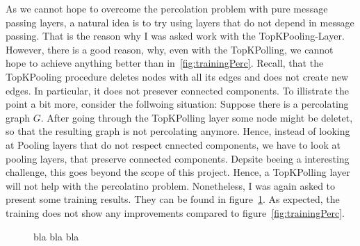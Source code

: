 As we cannot hope to overcome the percolation problem with pure message passing layers, 
a natural idea is to try using layers that do not depend in message passing. 
That is the reason why I was asked work with the TopKPooling-Layer.
However, there is a good reason, why, even with the TopKPolling, we cannot hope to achieve 
anything better than in~\ref{fig:trainingPerc}.
Recall, that the TopKPooling procedure deletes nodes with all its edges and does not create new edges. 
In particular, it does not presever connected components. To illistrate the point a bit more, 
consider the follwoing situation: Suppose there is a percolating graph $G$. 
After going through the TopKPolling layer some node might be deletet, 
so that the resulting graph is not percolating anymore. 
Hence, instead of looking at Pooling layers that do not respect cnnected components, we have to look 
at pooling layers, that preserve connected components.
Depsite beeing a interesting challenge, this goes beyond the scope of this project.
Hence, a TopKPolling layer will not help with the percolatino problem. 
Nonetheless, I was again asked to present some training results. They can be found in figure~\ref{fig:resTopK}. 
As expected, the training does not show any improvements compared to figure~\ref{fig:trainingPerc}.
\begin{figure}
    \centering
    \caption{bla bla bla}
    \label{fig:resTopK}
\end{figure}
 
